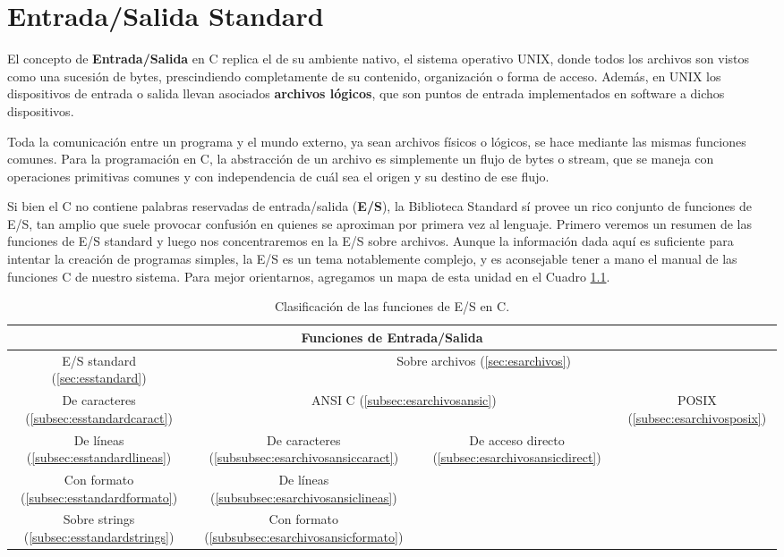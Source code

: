 


\chapter{Entrada/Salida Standard}

El concepto de \textbf{Entrada/Salida} en C replica el de su ambiente nativo, el sistema
operativo UNIX, donde todos los archivos son vistos como una sucesión de bytes,
prescindiendo completamente de su contenido, organización o forma de acceso.
Además, en UNIX los dispositivos de entrada o salida llevan asociados \textbf{archivos
lógicos}, que son puntos de entrada implementados en software a dichos
dispositivos. 

Toda la comunicación entre un programa y el mundo externo, ya
sean archivos físicos o lógicos, se hace mediante las mismas funciones comunes.
Para la programación en C, la abstracción de un
archivo es simplemente un flujo de bytes o stream, que se maneja con
operaciones primitivas comunes y con independencia de cuál sea el origen y su destino de ese flujo.

Si bien el C no contiene palabras reservadas de entrada/salida (\textbf{E/S}), la
Biblioteca Standard sí provee un rico conjunto de funciones de E/S, tan amplio
que suele provocar confusión en quienes se aproximan por primera vez al
lenguaje. Primero veremos un resumen de las funciones de E/S standard
y luego nos concentraremos en la E/S sobre archivos. Aunque la información dada
aquí es suficiente para intentar la creación de programas simples, la E/S es un
tema notablemente complejo, y es aconsejable tener a mano el manual de las
funciones C de nuestro sistema. Para mejor orientarnos, agregamos un mapa de esta unidad en el Cuadro \ref{tab:mapaes}.


\begin{table}[htbp]
\centering
\begin{tabular}{|c|c|c|c|}
\hline
\multicolumn{4}{|c|}{Funciones de Entrada/Salida}\\
\hline
		E/S standard (\ref{sec:esstandard})& \multicolumn{3}{c|}{Sobre archivos (\ref{sec:esarchivos})}\\
		\hline
		De caracteres (\ref{subsec:esstandardcaract})& \multicolumn{2}{c|}{ANSI C (\ref{subsec:esarchivosansic})}  & POSIX (\ref{subsec:esarchivosposix})\\\cline{2-4}
		De líneas (\ref{subsec:esstandardlineas})& De caracteres (\ref{subsubsec:esarchivosansiccaract})& De acceso directo (\ref{subsec:esarchivosansicdirect})& \\
		Con formato (\ref{subsec:esstandardformato})& De líneas (\ref{subsubsec:esarchivosansiclineas})& & \\
		Sobre strings (\ref{subsec:esstandardstrings})& Con formato (\ref{subsubsec:esarchivosansicformato})& & \\
\hline
\end{tabular}
\caption{Clasificación de las funciones de E/S en C.}
\label{tab:mapaes}
\end{table}


